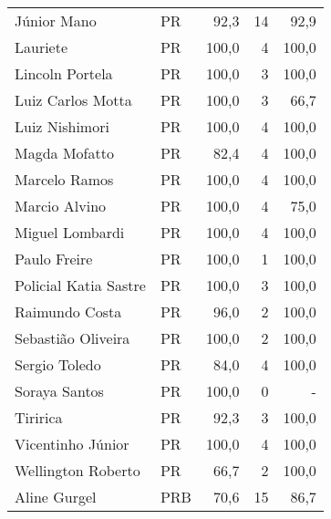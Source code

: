 \begin{longtable}{llrrr}
                         Júnior Mano &             PR &      92,3 &           14 &       92,9 \\
                            Lauriete &             PR &     100,0 &            4 &      100,0 \\
                     Lincoln Portela &             PR &     100,0 &            3 &      100,0 \\
                   Luiz Carlos Motta &             PR &     100,0 &            3 &       66,7 \\
                      Luiz Nishimori &             PR &     100,0 &            4 &      100,0 \\
                       Magda Mofatto &             PR &      82,4 &            4 &      100,0 \\
                       Marcelo Ramos &             PR &     100,0 &            4 &      100,0 \\
                       Marcio Alvino &             PR &     100,0 &            4 &       75,0 \\
                     Miguel Lombardi &             PR &     100,0 &            4 &      100,0 \\
                        Paulo Freire &             PR &     100,0 &            1 &      100,0 \\
               Policial Katia Sastre &             PR &     100,0 &            3 &      100,0 \\
                      Raimundo Costa &             PR &      96,0 &            2 &      100,0 \\
                  Sebastião Oliveira &             PR &     100,0 &            2 &      100,0 \\
                       Sergio Toledo &             PR &      84,0 &            4 &      100,0 \\
                       Soraya Santos &             PR &     100,0 &            0 &          - \\
                            Tiririca &             PR &      92,3 &            3 &      100,0 \\
                   Vicentinho Júnior &             PR &     100,0 &            4 &      100,0 \\
                  Wellington Roberto &             PR &      66,7 &            2 &      100,0 \\
                        Aline Gurgel &            PRB &      70,6 &           15 &       86,7 \\

\end{longtable}
